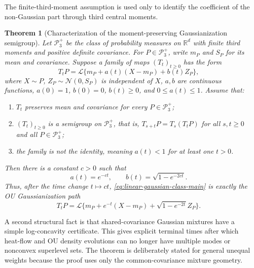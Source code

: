 \documentclass[preprint]{imsart}
\theoremstyle{plain}
\newtheorem{theorem}{Theorem}[section]
\theoremstyle{definition}
\newcommand{\R}{\mathbb{R}}
\newcommand{\Normal}{\mathcal{N}}
\begin{document}
The finite-third-moment assumption is used only to identify the coefficient
of the non-Gaussian part through third central moments.
\begin{theorem}[Characterization of the moment-preserving Gaussianization semigroup]
\label{thm:ou-characterization}
Let $\mathcal P_3^+$ be the class of probability measures on $\R^d$ with finite third moments and positive definite covariance. For $P\in\mathcal P_3^+$, write $m_P$ and $S_P$ for its mean and covariance. Suppose a family of maps $(T_t)_{t\ge0}$ has the form
\begin{equation}
  T_tP
  =\mathcal{L}\{m_P+a(t)(X-m_P)+b(t)Z_P\},
  \label{eq:linear-gaussian-class-main}
\end{equation}
where $X\sim P$, $Z_P\sim\Normal(0,S_P)$ is independent of $X$, $a,b$ are continuous functions, $a(0)=1$, $b(0)=0$, $b(t)\ge0$, and $0\le a(t)\le1$. Assume that:
\begin{enumerate}
\item $T_t$ preserves mean and covariance for every $P\in\mathcal P_3^+$;
\item $(T_t)_{t\ge0}$ is a semigroup on $\mathcal P_3^+$, that is, $T_{s+t}P=T_s(T_tP)$ for all $s,t\ge0$ and all $P\in\mathcal P_3^+$;
\item the family is not the identity, meaning $a(t)<1$ for at least one $t>0$.
\end{enumerate}
Then there is a constant $c>0$ such that
\begin{equation*}
  a(t)=e^{-ct},
  \qquad
  b(t)=\sqrt{1-e^{-2ct}}.
\end{equation*}
Thus, after the time change $t\mapsto ct$, \eqref{eq:linear-gaussian-class-main} is exactly the OU Gaussianization path
\[
  T_tP
  =\mathcal{L}\{m_P+e^{-t}(X-m_P)+\sqrt{1-e^{-2t}}Z_P\}.
\]
\end{theorem}

A second structural fact is that shared-covariance Gaussian mixtures have a simple log-concavity certificate. This gives explicit terminal times after which heat-flow and OU density evolutions can no longer have multiple modes or nonconvex superlevel sets. The theorem is deliberately stated for general unequal weights because the proof uses only the common-covariance mixture geometry.
\end{document}
